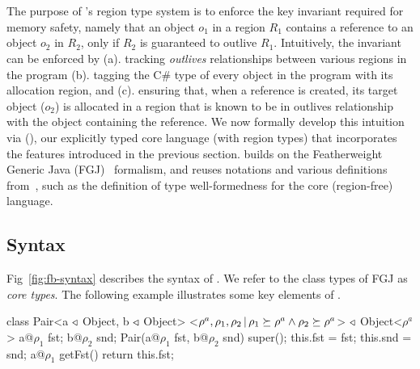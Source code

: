 \section{\fbname}
\label{sec:type-system}

The purpose of \name's region type system is to enforce the key
invariant required for memory safety, namely that an object $o_1$ in a
region $R_1$ contains a reference to an object $o_2$ in $R_2$, only if
$R_2$ is guaranteed to outlive $R_1$. Intuitively, the invariant can
be enforced by (a). tracking \emph{outlives} relationships between
various regions in the program (b). tagging the C\# type of every
object in the program with its allocation region, and (c).  ensuring
that, when a reference is created, its target object ($o_2$) is
allocated in a region that is known to be in outlives relationship
with the object containing the reference. We now formally develop this
intuition via \fbname (\FB), our explicitly typed core language (with region
types) that incorporates the features introduced in the previous
section. \fbname builds on the Featherweight Generic Java
(FGJ)~\cite{fgj} formalism, and reuses notations and various
definitions from~\cite{fgj}, such as the definition of type
well-formedness for the core (region-free) language. 


\subsection{Syntax}
\label{sec:fb-syntax}



Fig~\ref{fig:fb-syntax} describes the syntax of \FB.
We refer to the class types of FGJ as \emph{core types}.
%
The following example illustrates some  key elements of \FB.
\begin{codejava}[mathescape=true]
class Pair<a $\triangleleft$ Object, b $\triangleleft$ Object>
          <$\rho^a, \rho_1, \rho_2 \,|\, \rho_1 \succeq \rho^a \wedge \rho_2 \succeq \rho^a$> $\triangleleft$ Object<$\rho^a$>
           {
  a@$\rho_1$ fst; 
  b@$\rho_2$ snd;
  Pair(a@$\rho_1$ fst, b@$\rho_2$ snd) {
    super(); 
    this.fst = fst; 
    this.snd = snd;
  }
  a@$\rho_1$ getFst() {
    return this.fst;
  }
}
\end{codejava}

